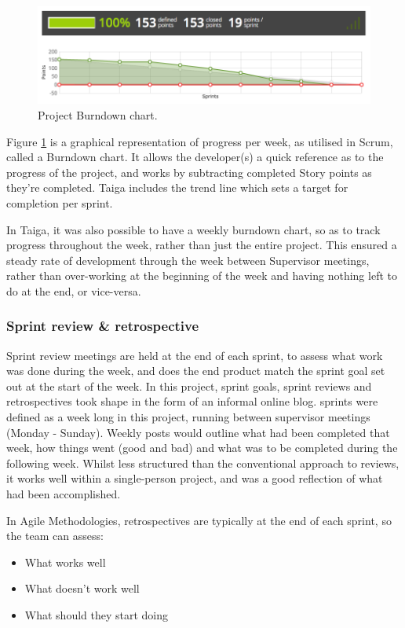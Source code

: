 \begin{figure}[H]
  \centering
  \includegraphics[width=\textwidth]{Chapter2/software-img/burndown.png}
  \caption{Project Burndown chart.}
  \label{fig:burndown}
\end{figure}

Figure \ref{fig:burndown} is a graphical representation of progress per week, as utilised in Scrum, called a Burndown chart. It allows the developer(s) a quick reference as to the progress of the project, and works by subtracting completed Story points as they're completed. Taiga includes the trend line which sets a target for completion per sprint.

In Taiga, it was also possible to have a weekly burndown chart, so as to track progress throughout the week, rather than just the entire project. This ensured a steady rate of development through the week between Supervisor meetings, rather than over-working at the beginning of the week and having nothing left to do at the end, or vice-versa.

\subsubsection{Sprint review \& retrospective}

Sprint review meetings are held at the end of each sprint, to assess what work was done during the week, and does the end product match the sprint goal set out at the start of the week. In this project, sprint goals, sprint reviews and retrospectives took shape in the form of an informal online blog. sprints were defined as a week long in this project, running between supervisor meetings (Monday - Sunday). Weekly posts would outline what had been completed that week, how things went (good and bad) and what was to be completed during the following week. Whilst less structured than the conventional approach to reviews, it works well within a single-person project, and was a good reflection of what had been accomplished.

In Agile Methodologies, retrospectives are typically at the end of each sprint, so the team can assess:
\begin{itemize}
  \item What works well
  \item What doesn't work well
  \item What should they start doing
\end{itemize}

